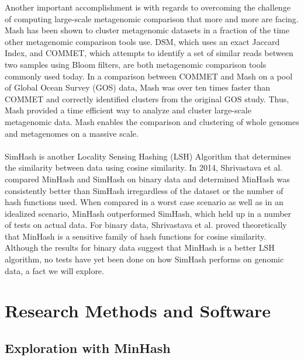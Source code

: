 \documentclass[12pt, letterpaper]{article}
\begin{document}
Another important accomplishment is with regards to overcoming the challenge of computing large-scale metagenomic comparison that more and more are facing. Mash has been shown to cluster metagenomic datasets in a fraction of the time other metagenomic comparison tools use. DSM, which uses an exact Jaccard Index, and COMMET, which attempts to identify a set of similar reads between two samples using Bloom filters, are both metagenomic comparison tools commonly used today. In a comparison between COMMET and Mash on a pool of Global Ocean Survey (GOS) data, Mash was over ten times faster than COMMET and correctly identified clusters from the original GOS study. Thus, Mash provided a time efficient way to analyze and cluster large-scale metagenomic data. Mash enables the comparison and clustering of whole genomes and metagenomes on a massive scale. \\ \\






SimHash is another Locality Sensing Hashing (LSH) Algorithm that determines the similarity between data using cosine similarity. In 2014, Shrivastava et al. compared MinHash and SimHash on binary data and determined MinHash was consistently better than SimHash irregardless of the dataset or the number of hash functions used.\cite{MinvsSim} When compared in a worst case scenario as well as in an idealized scenario, MinHash outperformed SimHash, which held up in a number of tests on actual data. For binary data, Shrivastava et al. proved theoretically that MinHash is a sensitive family of hash functions for cosine similarity. Although the results for binary data suggest that MinHash is a better LSH algorithm, no tests have yet been done on how SimHash performs on genomic data, a fact we will explore.

\section{Research Methods and Software}

\subsection{Exploration with MinHash}
\end{document}
